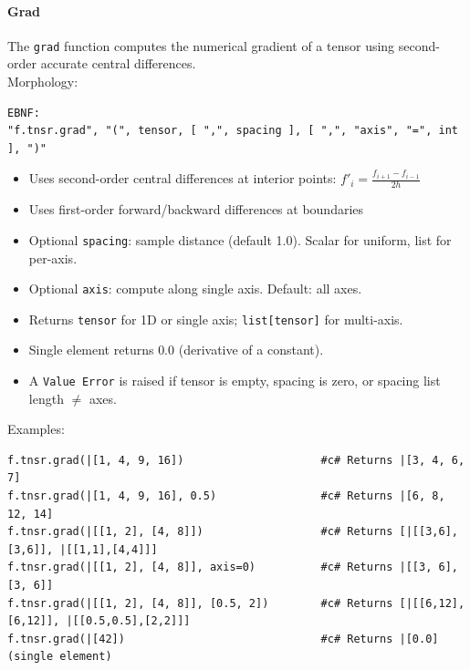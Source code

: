 \paragraph{Grad}
The \texttt{grad} function computes the numerical gradient of a tensor using second-order accurate central differences.\\
Morphology:
\begin{verbatim}
EBNF:
"f.tnsr.grad", "(", tensor, [ ",", spacing ], [ ",", "axis", "=", int ], ")"
\end{verbatim}
\begin{itemize}
\item Uses second-order central differences at interior points: $f'_i = \frac{f_{i+1} - f_{i-1}}{2h}$
\item Uses first-order forward/backward differences at boundaries
\item Optional \texttt{spacing}: sample distance (default 1.0). Scalar for uniform, list for per-axis.
\item Optional \texttt{axis}: compute along single axis. Default: all axes.
\item Returns \texttt{tensor} for 1D or single axis; \texttt{list[tensor]} for multi-axis.
\item Single element returns $0.0$ (derivative of a constant).
\item A \texttt{Value Error} is raised if tensor is empty, spacing is zero, or spacing list length $\neq$ axes.
\end{itemize}
Examples:
\begin{verbatim}
f.tnsr.grad(|[1, 4, 9, 16])                     #c# Returns |[3, 4, 6, 7]
f.tnsr.grad(|[1, 4, 9, 16], 0.5)                #c# Returns |[6, 8, 12, 14]
f.tnsr.grad(|[[1, 2], [4, 8]])                  #c# Returns [|[[3,6],[3,6]], |[[1,1],[4,4]]]
f.tnsr.grad(|[[1, 2], [4, 8]], axis=0)          #c# Returns |[[3, 6], [3, 6]]
f.tnsr.grad(|[[1, 2], [4, 8]], [0.5, 2])        #c# Returns [|[[6,12],[6,12]], |[[0.5,0.5],[2,2]]]
f.tnsr.grad(|[42])                              #c# Returns |[0.0]  (single element)
\end{verbatim}

